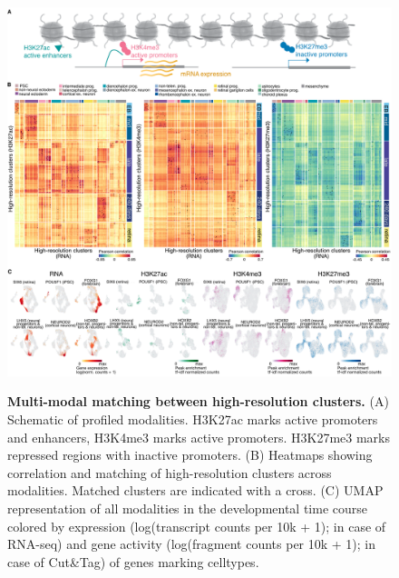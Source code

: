 \begin{figure}[h!]
    \centering
	\includegraphics[width=\textwidth]{figures/cnt/Figure_S2}
    \label{fig:regS2}
    \caption{\textbf{Multi-modal matching between high-resolution clusters.}
    (A) Schematic of profiled modalities. H3K27ac marks active promoters and enhancers, H3K4me3 marks active promoters. H3K27me3 marks repressed regions with inactive promoters. (B) Heatmaps showing correlation and matching of high-resolution clusters across modalities. Matched clusters are indicated with a cross. (C) UMAP representation of all modalities in the developmental time course colored by expression (log(transcript counts per 10k + 1); in case of RNA-seq) and gene activity (log(fragment counts per 10k + 1); in case of Cut\&Tag) of genes marking celltypes.}
\end{figure}


